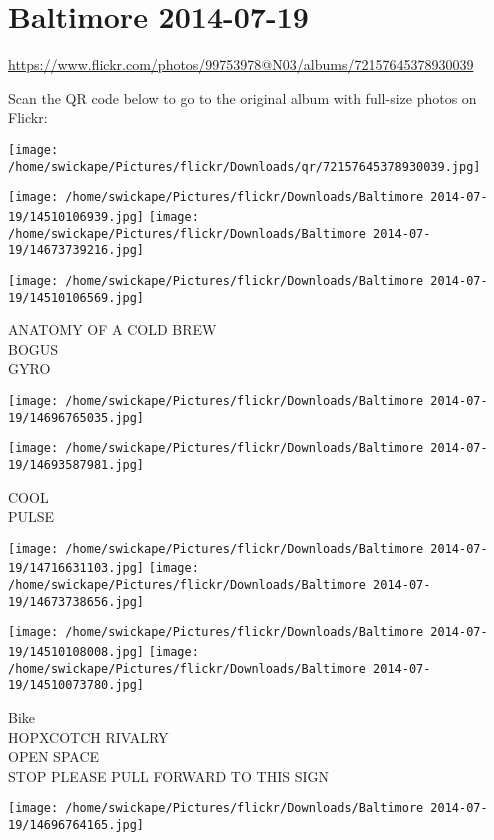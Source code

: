 \documentclass[10pt,letterpaper]{article}
\title{}
\author{}
\date{}
\begin{document}
\section*{Baltimore 2014-07-19}

\url{https://www.flickr.com/photos/99753978@N03/albums/72157645378930039}

Scan the QR code below to go to the original album with full-size photos on Flickr:

\texttt{[image: /home/swickape/Pictures/flickr/Downloads/qr/72157645378930039.jpg]}
\pagebreak

\texttt{[image: /home/swickape/Pictures/flickr/Downloads/Baltimore 2014-07-19/14510106939.jpg]}
\texttt{[image: /home/swickape/Pictures/flickr/Downloads/Baltimore 2014-07-19/14673739216.jpg]}

\vspace{0.25in}
\texttt{[image: /home/swickape/Pictures/flickr/Downloads/Baltimore 2014-07-19/14510106569.jpg]}

ANATOMY OF A COLD BREW\\
BOGUS\\
GYRO
\pagebreak

\texttt{[image: /home/swickape/Pictures/flickr/Downloads/Baltimore 2014-07-19/14696765035.jpg]}

\vspace{0.25in}
\texttt{[image: /home/swickape/Pictures/flickr/Downloads/Baltimore 2014-07-19/14693587981.jpg]}

COOL\\
PULSE
\pagebreak

\texttt{[image: /home/swickape/Pictures/flickr/Downloads/Baltimore 2014-07-19/14716631103.jpg]}
\texttt{[image: /home/swickape/Pictures/flickr/Downloads/Baltimore 2014-07-19/14673738656.jpg]}

\texttt{[image: /home/swickape/Pictures/flickr/Downloads/Baltimore 2014-07-19/14510108008.jpg]}
\texttt{[image: /home/swickape/Pictures/flickr/Downloads/Baltimore 2014-07-19/14510073780.jpg]}

Bike\\
HOPXCOTCH RIVALRY\\
OPEN SPACE\\
STOP PLEASE PULL FORWARD TO THIS SIGN
\pagebreak

\texttt{[image: /home/swickape/Pictures/flickr/Downloads/Baltimore 2014-07-19/14696764165.jpg]}
\end{document}
